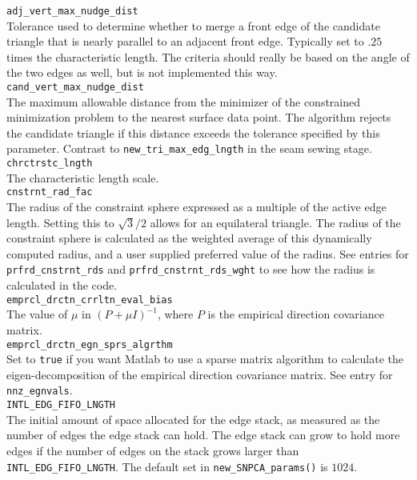 \documentclass[11pt]{amsart}
\begin{document}
\noindent
\verb+adj_vert_max_nudge_dist+\\
\noindent
Tolerance used to determine whether to merge a front edge of the candidate triangle that is nearly parallel to an adjacent front edge.
Typically set to $.25$ times the characteristic length.
The criteria should really be based on the angle of the two edges as well, but is not implemented this way.
\\[\baselineskip]
\noindent
\verb+cand_vert_max_nudge_dist+\\
\noindent
The maximum allowable distance from the minimizer of the constrained minimization problem to the nearest surface data point.
The algorithm rejects the candidate triangle if this distance exceeds the tolerance specified by this parameter.
Contrast to \verb+new_tri_max_edg_lngth+ in the seam sewing stage.
\\[\baselineskip]
\noindent
\verb+chrctrstc_lngth+\\
\noindent
The characteristic length scale.
\\[\baselineskip]
\noindent
\verb+cnstrnt_rad_fac+\\
\noindent
The radius of the constraint sphere expressed as a multiple of the active edge length. 
Setting this to $\sqrt{3}/2$ allows for an equilateral triangle.
The radius of the constraint sphere is calculated as the weighted average of this dynamically computed radius, and a user supplied preferred value of the radius.
See entries for \verb+prfrd_cnstrnt_rds+ and \verb+prfrd_cnstrnt_rds_wght+ to see how the radius is calculated in the code.
\\[\baselineskip]
\noindent
\verb+emprcl_drctn_crrltn_eval_bias+\\
\noindent
The value of $\mu$ in $(P + \mu I)^{-1}$, where $P$ is the empirical direction covariance matrix.
\\[\baselineskip]
\noindent
\verb+emprcl_drctn_egn_sprs_algrthm+\\
\noindent
Set to \verb+true+ if you want Matlab to use a sparse matrix algorithm to calculate the eigen-decomposition of the empirical direction covariance matrix.
See entry for \verb+nnz_egnvals+.
\\[\baselineskip]
\noindent
\verb+INTL_EDG_FIFO_LNGTH+\\
\noindent
The initial amount of space allocated for the edge stack, as measured as the number of edges the edge stack can hold.
The edge stack can grow to hold more edges if the number of edges on the stack grows larger than \verb+INTL_EDG_FIFO_LNGTH+.
The default set in \verb+new_SNPCA_params()+ is $1024$.
\end{document}
